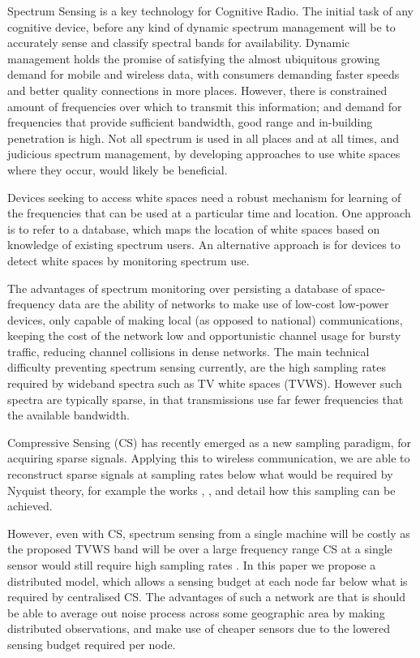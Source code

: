 Spectrum Sensing is a key technology for Cognitive Radio. The initial task of any cognitive device, before any kind of dynamic spectrum management will be to accurately sense and classify spectral bands for availability. Dynamic management holds the promise of satisfying the almost ubiquitous growing demand for mobile and wireless data, with consumers demanding faster speeds and better quality connections in more places. However, there is constrained amount of frequencies over which to transmit this information; and demand for frequencies that provide sufficient bandwidth, good range and in-building penetration is high. Not all spectrum is used in all places and at all times, and judicious spectrum management, by developing approaches to use white spaces where they occur, would likely be beneficial.

Devices seeking to access white spaces need a robust mechanism for learning of the frequencies that can be used at a particular time and location. One approach is to refer to a database, which maps the location of white spaces based on knowledge of existing spectrum users. An alternative approach is for devices to detect white spaces by monitoring spectrum use. 

The advantages of spectrum monitoring \cite{akan2009cognitive} over persisting a database of space-frequency data are the ability of networks to make use of low-cost low-power devices, only capable of making local (as opposed to national) communications, keeping the cost of the network low and  opportunistic channel usage for bursty traffic, reducing channel collisions in dense networks. The main technical difficulty preventing spectrum sensing currently, are the high sampling rates required by wideband spectra such as TV white spaces (TVWS). However such spectra are typically sparse, in that transmissions use far fewer frequencies that the available bandwidth. 

Compressive Sensing (CS) \cite{Candes2006} has recently emerged as a new sampling paradigm, for acquiring sparse signals. Applying this to wireless communication, we are able to reconstruct sparse signals at sampling rates below what would be required by Nyquist theory, for example the works \cite{mishali2010theory}, \cite{polo2009compressive}, and \cite{tropp2010beyond} detail how this sampling can be achieved. 

However, even with CS, spectrum sensing from a single machine will be costly as the proposed TVWS band will be over a large frequency range CS at a single sensor would still require high sampling rates \cite{Zhang2011b}. In this paper we propose a distributed model, which allows a sensing budget at each node far below what is required by centralised CS. The advantages of such a network are that is should be able to average out noise process across some geographic area by making distributed observations, and make use of cheaper sensors due to the lowered sensing budget required per node. 

